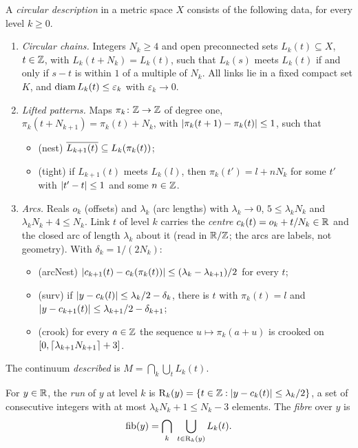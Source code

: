 \begin{definition}\label{def:circdescr}
A \emph{circular description} in a metric space $X$ consists of the following data, for every level $k\ge0$.
\begin{enumerate}[label=(\arabic*)]
\item \emph{Circular chains.} Integers $N_k\ge4$ and open preconnected sets $L_k(t)\subseteq X$, $t\in\mathbb{Z}$, with $L_k(t+N_k)=L_k(t)$, such that $L_k(s)$ meets $L_k(t)$ if and
only if $s-t$ is within $1$ of a multiple of $N_k$. All links lie in a fixed compact set $K$, and $\operatorname{diam} L_k(t)\le\varepsilon_k$ with $\varepsilon_k\to0$.
\item \emph{Lifted patterns.} Maps $\pi_k\colon\mathbb{Z}\to\mathbb{Z}$ of degree one, $\pi_k(t+N_{k+1})=\pi_k(t)+N_k$, with $\left\lvert \pi_k(t+1)-\pi_k(t)\right\rvert\le1$, such that
\begin{itemize}
\item (nest) $\overline{L_{k+1}(t)}\subseteq L_k(\pi_k(t))$;
\item (tight) if $L_{k+1}(t)$ meets $L_k(l)$, then $\pi_k(t')=l+nN_k$ for some $t'$ with $\left\lvert t'-t\right\rvert\le1$ and some $n\in\mathbb{Z}$.
\end{itemize}
\item \emph{Arcs.} Reals $o_k$ (offsets) and $\lambda_k$ (arc lengths) with $\lambda_k\to0$, $5\le\lambda_kN_k$ and $\lambda_kN_k+4\le N_k$. Link $t$ of level $k$ carries the
\emph{centre} $c_k(t)=o_k+t/N_k\in\mathbb{R}$ and the closed arc of length $\lambda_k$ about it (read in $\mathbb{R}/\mathbb{Z}$; the arcs are labels, not geometry). With $\delta_k=1/(2N_k)$:
\begin{itemize}
\item (arcNest) $\left\lvert c_{k+1}(t)-c_k(\pi_k(t))\right\rvert\le(\lambda_k-\lambda_{k+1})/2$ for every $t$;
\item (surv) if $\left\lvert y-c_k(l)\right\rvert\le\lambda_k/2-\delta_k$, there is $t$ with $\pi_k(t)=l$ and $\left\lvert y-c_{k+1}(t)\right\rvert\le\lambda_{k+1}/2-\delta_{k+1}$;
\item (crook) for every $a\in\mathbb{Z}$ the sequence $u\mapsto\pi_k(a+u)$ is crooked on $[0,\left\lceil \lambda_{k+1}N_{k+1}\right\rceil+3]$.
\end{itemize}
\end{enumerate}
The continuum \emph{described} is $M=\bigcap_k\bigcup_tL_k(t)$.
\end{definition}


For $y\in\mathbb{R}$, the \emph{run} of $y$ at level $k$ is $\operatorname{R}_k(y)=\left\{ t\in\mathbb{Z}:\left\lvert y-c_k(t)\right\rvert\le\lambda_k/2 \right\}$, a set of consecutive integers with at most $\lambda_kN_k+1\le N_k-3$
elements. The \emph{fibre} over $y$ is
\[
\mathrm{fib}(y)=\bigcap_k\ \bigcup_{t\in\run_k(y)}L_k(t).
\]


